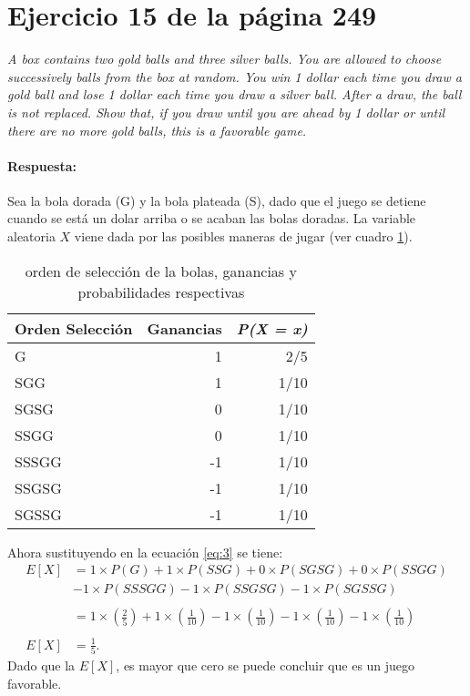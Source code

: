 \documentclass{article}
\begin{document}
\section{Ejercicio 15 de la página 249}
\emph{A box contains two gold balls and three silver balls. You are allowed to choose successively balls from the box at random. You win 1 dollar each time you draw a gold ball and lose 1 dollar each time you draw a silver ball. After a draw, the ball is not replaced. Show that, if you draw until you are ahead by 1 dollar or until there are no more gold balls, this is a favorable game.}

\paragraph{Respuesta:} Sea la bola dorada (G) y la bola plateada (S), dado que el juego se detiene cuando se está un dolar arriba o se acaban las bolas doradas. La variable aleatoria $X$ viene dada por las posibles maneras de jugar (ver cuadro \ref{tab:4}).
\begin{table}[H]
  \centering
  \caption{orden de selección de la bolas, ganancias y probabilidades respectivas }
    \begin{tabular}{lrr}
    \toprule
    \textbf{Orden  Selección} & \multicolumn{1}{l}{\textbf{Ganancias}} & \multicolumn{1}{l}{\textit{\textbf{P(X = x)}}} \\
    \midrule
    G     & 1     & 2/5 \\
    SGG   & 1     & 1/10 \\
    SGSG  & 0     & 1/10 \\
    SSGG  & 0     & 1/10 \\
    SSSGG & -1    & 1/10 \\
    SSGSG & -1    & 1/10 \\
    SGSSG & -1    & 1/10 \\
    \bottomrule
    \end{tabular}%
  \label{tab:4}%
\end{table}%
Ahora sustituyendo en la ecuación \ref{eq:3} se tiene:
\begin{equation}
\begin{array}{ll}
   E[X] &= 1\times P(G)+1\times P(SSG) + 0 \times P(SGSG) +0 \times P(SSGG) \\
   & -1\times P(SSSGG) -1 \times P(SSGSG) -1 \times P(SGSSG)\\
   &\\
    & = 1\times (\frac{2}{5})+ 1\times(\frac{1}{10})-1\times(\frac{1}{10})-1\times(\frac{1}{10}) -1\times(\frac{1}{10})\\ 
    &\\
   E[X] & = \frac{1}{5}.
 
  \end{array}
\end{equation}
  Dado que la $E[X]$, es mayor que cero se puede concluir que es un juego favorable.
\end{document}
